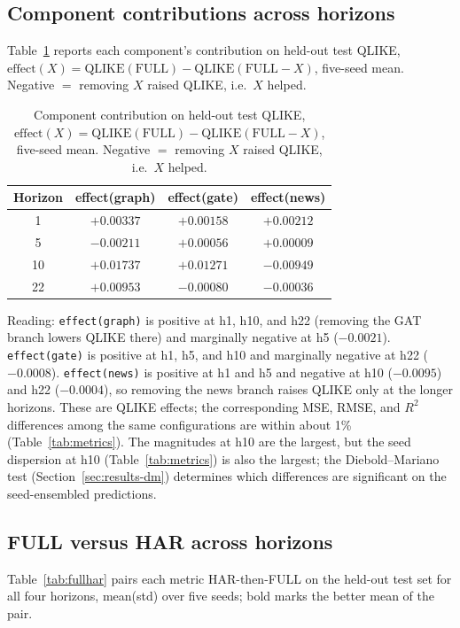 \documentclass[runningheads]{llncs}
\begin{document}
\subsection{Component contributions across horizons}
\label{sec:results-effects}
Table~\ref{tab:effects} reports each component's contribution on held-out test QLIKE,
$\text{effect}(X)=\text{QLIKE}(\text{FULL})-\text{QLIKE}(\text{FULL}{-}X)$, five-seed mean. Negative $=$
removing $X$ raised QLIKE, i.e.\ $X$ helped.

\begin{table}[t]
\caption{Component contribution on held-out test QLIKE,
$\text{effect}(X)=\text{QLIKE}(\text{FULL})-\text{QLIKE}(\text{FULL}{-}X)$, five-seed mean. Negative $=$
removing $X$ raised QLIKE, i.e.\ $X$ helped.}
\label{tab:effects}
\centering
\begin{tabular}{cccc}
\toprule
Horizon & effect(graph) & effect(gate) & effect(news) \\
\midrule
1  & $+0.00337$ & $+0.00158$ & $+0.00212$ \\
5  & $-0.00211$ & $+0.00056$ & $+0.00009$ \\
10 & $+0.01737$ & $+0.01271$ & $-0.00949$ \\
22 & $+0.00953$ & $-0.00080$ & $-0.00036$ \\
\bottomrule
\end{tabular}
\end{table}

Reading: \texttt{effect(graph)} is positive at h1, h10, and h22 (removing the GAT branch lowers QLIKE
there) and marginally negative at h5 ($-0.0021$). \texttt{effect(gate)} is positive at h1, h5, and h10 and
marginally negative at h22 ($-0.0008$). \texttt{effect(news)} is positive at h1 and h5 and negative at h10
($-0.0095$) and h22 ($-0.0004$), so removing the news branch raises QLIKE only at the longer horizons.
These are QLIKE effects; the corresponding MSE, RMSE, and $R^2$ differences among the same configurations
are within about 1\% (Table~\ref{tab:metrics}). The magnitudes at h10 are the largest, but the seed
dispersion at h10 (Table~\ref{tab:metrics}) is also the largest; the Diebold--Mariano test
(Section~\ref{sec:results-dm}) determines which differences are significant on the seed-ensembled
predictions.

\subsection{FULL versus HAR across horizons}
\label{sec:results-fullhar}
Table~\ref{tab:fullhar} pairs each metric HAR-then-FULL on the held-out test set for all four horizons,
mean(std) over five seeds; bold marks the better mean of the pair.
\end{document}
